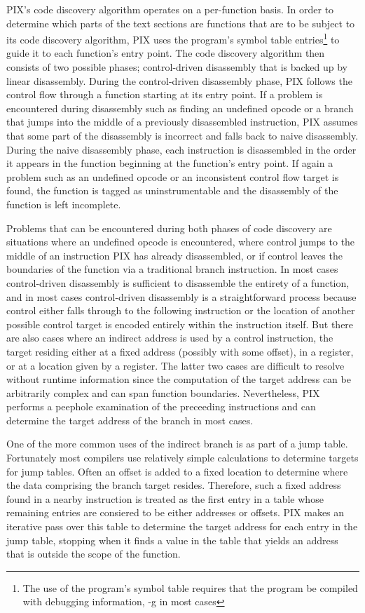 PIX's code discovery algorithm operates on a per-function basis.
In order to determine which parts of the text sections are functions that are to be subject to its code discovery algorithm, 
PIX uses the program's symbol table entries\footnote{The use of the program's symbol table requires that the program be compiled
with debugging information, -g in most cases} to guide it to each function's entry point. The code discovery algorithm then
consists of two possible phases; control-driven disassembly that is backed up by linear disassembly. During the control-driven disassembly phase, 
PIX follows the control flow through a function starting at its entry point. If a problem is encountered during disassembly such as 
finding an undefined opcode or a branch that jumps into the middle of a previously disassembled instruction, 
PIX assumes that some part of the disassembly is incorrect and falls back to naive 
disassembly. During the naive disassembly phase, each instruction is disassembled in the order it appears in the
function beginning at the function's entry point. If again a problem such as an undefined opcode or an inconsistent control flow target 
is found, the function is tagged as uninstrumentable and the disassembly of the function is left incomplete.

Problems that can be encountered during both phases of code discovery
are situations where an undefined opcode is encountered, where control jumps to the
middle of an instruction PIX has already disassembled, or if control leaves the boundaries of the function via a traditional branch
instruction. In most
cases control-driven disassembly is sufficient to disassemble the entirety of a function, and in most cases control-driven
disassembly is a straightforward process because control either falls through to the following instruction 
or the location of another possible control target is encoded entirely within the instruction itself. But there are also cases
where an indirect address is used by a control instruction, the target residing either at a fixed address (possibly with some offset), in a register, 
or at a location given by a register. The latter two cases are difficult to resolve
without runtime information since the computation of the target address can be arbitrarily complex and can span function
boundaries. Nevertheless, PIX performs a peephole examination of the preceeding instructions and can determine 
the target address of the branch in most cases.

One of the more common uses of the indirect branch is as part of a jump table. 
Fortunately most compilers use relatively simple calculations to determine targets for jump tables. 
Often an offset is added to a fixed location to determine where the data comprising the branch target
resides. Therefore, such a fixed address found in a nearby instruction 
is treated as the first entry in a table whose remaining entries are consiered to be either addresses or offsets.
PIX makes an iterative pass over this table to determine the target 
address for each entry in the jump table, stopping when it finds a value in the
table that yields an address that is outside the scope of the function.

